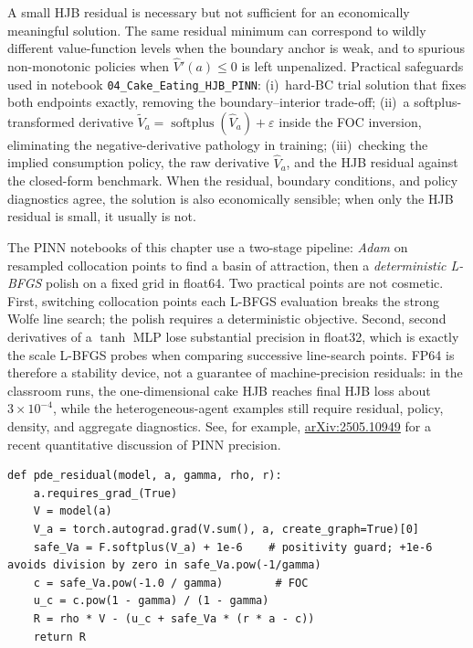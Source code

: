 \documentclass[11pt,a4paper]{report}
\begin{document}
\begin{remarkbox}
A small HJB residual is necessary but not sufficient for an economically meaningful solution.  The same residual minimum can correspond to wildly different value-function levels when the boundary anchor is weak, and to spurious non-monotonic policies when $\hat V'(a) \le 0$ is left unpenalized.  Practical safeguards used in notebook \texttt{04\_Cake\_Eating\_HJB\_PINN}: (i)~hard-BC trial solution that fixes both endpoints exactly, removing the boundary--interior trade-off; (ii)~a softplus-transformed derivative $\widetilde V_a=\operatorname{softplus}(\hat V_a)+\varepsilon$ inside the FOC inversion, eliminating the negative-derivative pathology in training; (iii)~checking the implied consumption policy, the raw derivative $\hat V_a$, and the HJB residual against the closed-form benchmark.  When the residual, boundary conditions, and policy diagnostics agree, the solution is also economically sensible; when only the HJB residual is small, it usually is not.
\end{remarkbox}

\begin{remarkbox}
The PINN notebooks of this chapter use a two-stage pipeline: \emph{Adam} on resampled collocation points to find a basin of attraction, then a \emph{deterministic L-BFGS} polish on a fixed grid in float64.  Two practical points are not cosmetic.  First, switching collocation points each L-BFGS evaluation breaks the strong Wolfe line search; the polish requires a deterministic objective.  Second, second derivatives of a $\tanh$ MLP lose substantial precision in float32, which is exactly the scale L-BFGS probes when comparing successive line-search points.  FP64 is therefore a stability device, not a guarantee of machine-precision residuals: in the classroom runs, the one-dimensional cake HJB reaches final HJB loss about $3\times 10^{-4}$, while the heterogeneous-agent examples still require residual, policy, density, and aggregate diagnostics.  See, for example, \href{https://arxiv.org/abs/2505.10949}{arXiv:2505.10949} for a recent quantitative discussion of PINN precision.
\end{remarkbox}

\begin{lstlisting}[caption={PINN residual for the HJB equation (PyTorch).}]
def pde_residual(model, a, gamma, rho, r):
    a.requires_grad_(True)
    V = model(a)
    V_a = torch.autograd.grad(V.sum(), a, create_graph=True)[0]
    safe_Va = F.softplus(V_a) + 1e-6    # positivity guard; +1e-6 avoids division by zero in safe_Va.pow(-1/gamma)
    c = safe_Va.pow(-1.0 / gamma)        # FOC
    u_c = c.pow(1 - gamma) / (1 - gamma)
    R = rho * V - (u_c + safe_Va * (r * a - c))
    return R
\end{lstlisting}
\end{document}
